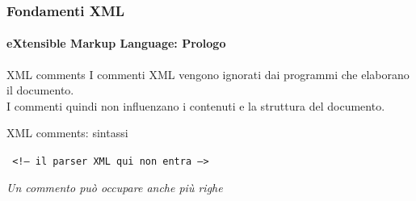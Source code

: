 



\begin{frame}
	\frametitle{Fondamenti XML}
	\framesubtitle{eXtensible Markup Language: Prologo}
	\addtocounter{nframe}{1}

	\begin{block}{XML comments}
		I commenti XML vengono ignorati dai programmi che elaborano il documento.
		\\I commenti quindi non influenzano i contenuti e la struttura del documento.
	\end{block}

	\begin{block}{XML comments: sintassi}
	\begin{center}\texttt{
		<!-- il parser XML qui non entra -->
	}\end{center}
	\end{block}

	\textit{Un commento può occupare anche più righe}
	
\end{frame}

